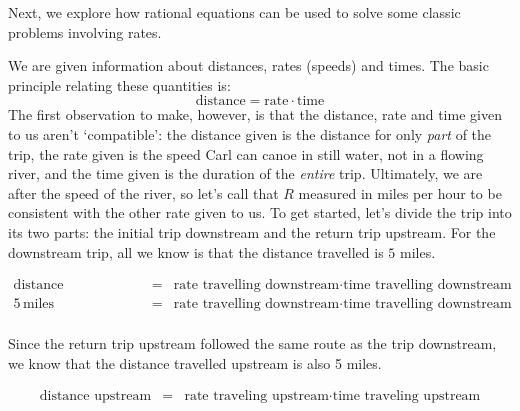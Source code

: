 \medskip

Next, we explore how rational equations can be used to solve some classic problems involving rates.

\medskip

{
We are given information about distances, rates (speeds) and times.  The basic principle relating these quantities is: \[ \text{distance} = \text{rate} \cdot \text{time}\]  The first observation to make, however, is that the distance, rate and time given to us aren't `compatible':  the distance given is the distance for only \textit{part} of the trip,  the rate given is the speed Carl can canoe in still water, not in a flowing river, and  the time given is the duration of the \textit{entire} trip.  Ultimately, we are after the speed of the river, so let's call that $R$ measured in miles per hour to be consistent with the other rate given to us.  To get started, let's divide the trip into its two parts:  the initial trip downstream and the return trip upstream.  For the downstream trip, all we know is that the distance travelled is $5$ miles.

\[ \begin{array}{rcl}

\text{distance downstream} & = & \text{rate travelling downstream} \cdot \text{time travelling downstream} \\

5 \, \text{miles} & = & \text{rate travelling downstream} \cdot \text{time travelling downstream} \\ \end{array} \]

Since the return trip upstream followed the same route as the trip downstream, we know that the distance travelled upstream is also 5 miles.

\[ \begin{array}{rcl}

\text{distance upstream} & = & \text{rate traveling upstream} \cdot \text{time traveling upstream} \\


\end{array}\]}
